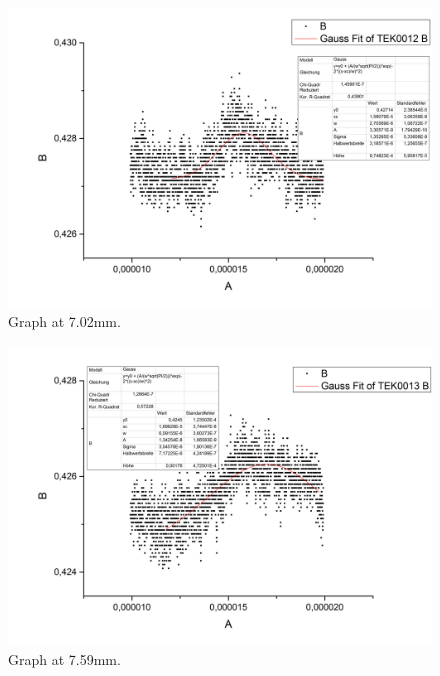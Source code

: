 \begin{figure}[h]
\begin{center}
\includegraphics[scale=0.25]{Bilder/Teil2/Graph11}
\caption{Graph at 7.02mm.}
\label{fig:graph11}
\end{center}
\end{figure}
\begin{figure}[h]
\begin{center}
\includegraphics[scale=0.25]{Bilder/Teil2/Graph12}
\caption{Graph at 7.59mm.}
\label{fig:graph12}
\end{center}
\end{figure}
\newpage
